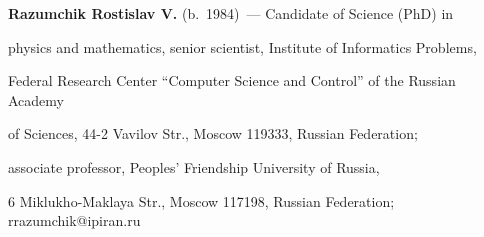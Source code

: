     


    \vspace*{3pt}


    


    \noindent


    \textbf{Razumchik Rostislav V.} (b.\ 1984)~--- Candidate of Science (PhD) in 


    physics and mathematics, senior scientist, Institute of Informatics Problems, 


    Federal Research Center ``Computer Science and Control'' of the Russian Academy 


    of Sciences, 44-2 Vavilov Str., Moscow 119333, Russian Federation; 


    associate professor, Peoples' Friendship University of Russia, 


    6 Miklukho-Maklaya Str., Moscow 117198, Russian Federation; rrazumchik@ipiran.ru 


    


    


\label{end\stat}








\renewcommand{\bibname}{\protect\rm Литература}


